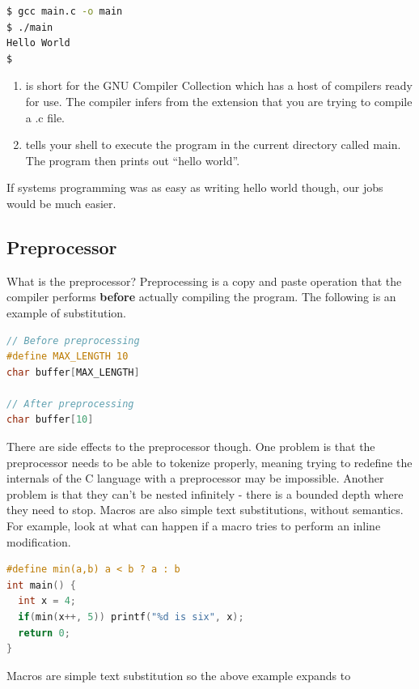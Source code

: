 \begin{lstlisting}[language=bash]
$ gcc main.c -o main
$ ./main
Hello World
$
\end{lstlisting}

\begin{enumerate}
\item {} is short for the GNU Compiler Collection which has a host of compilers ready for use.
  The compiler infers from the extension that you are trying to compile a .c file.
\item {} tells your shell to execute the program in the current directory called main.
  The program then prints out ``hello world''.
\end{enumerate}

If systems programming was as easy as writing hello world though, our jobs would be much easier.

\subsection{Preprocessor}

What is the preprocessor?
Preprocessing is a copy and paste operation that the compiler performs \textbf{before} actually compiling the program.
The following is an example of substitution.

\begin{lstlisting}[language=C]
// Before preprocessing
#define MAX_LENGTH 10
char buffer[MAX_LENGTH]

// After preprocessing
char buffer[10]
\end{lstlisting}

There are side effects to the preprocessor though.
One problem is that the preprocessor needs to be able to tokenize properly, meaning trying to redefine the internals of the C language with a preprocessor may be impossible.
Another problem is that they can't be nested infinitely - there is a bounded depth where they need to stop.
Macros are also simple text substitutions, without semantics.
For example, look at what can happen if a macro tries to perform an inline modification.

\begin{lstlisting}[language=C]
#define min(a,b) a < b ? a : b
int main() {
  int x = 4;
  if(min(x++, 5)) printf("%d is six", x);
  return 0;
}
\end{lstlisting}

Macros are simple text substitution so the above example expands to

